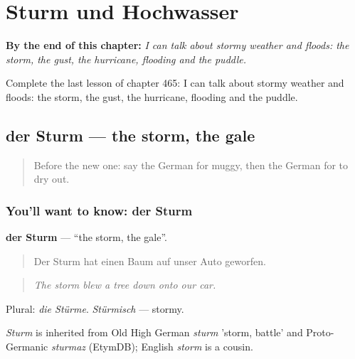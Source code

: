 
\chapter{Sturm und Hochwasser}
\label{ch:ge-sturm-und-hochwasser}

\begin{chapteropening}
\textbf{By the end of this chapter:} \emph{I can talk about stormy weather and floods: the storm, the gust, the hurricane, flooding and the puddle.}

Complete the last lesson of chapter 465: I can talk about stormy weather and floods: the storm, the gust, the hurricane, flooding and the puddle.
\end{chapteropening}

\section[der Sturm]{der Sturm — the storm, the gale}

\label{lesson:GE-C465-sturm}



\begin{quote}
Before the new one: say the German for muggy, then the German for to dry out.
\end{quote}

\subsection*{You'll want to know: der Sturm}
\textbf{der Sturm} — \textquotedblleft{}the storm, the gale\textquotedblright{}.

\begin{quote}
Der Sturm hat einen Baum auf unser Auto geworfen.
\end{quote}

\begin{quote}
\emph{The storm blew a tree down onto our car.}
\end{quote}

Plural: \emph{die Stürme}. \emph{Stürmisch} — stormy.

\begin{cousinweb}
\emph{Sturm} is inherited from Old High German \emph{sturm} 'storm, battle' and Proto-Germanic \emph{sturmaz} (EtymDB); English \emph{storm} is a cousin.
\end{cousinweb}

